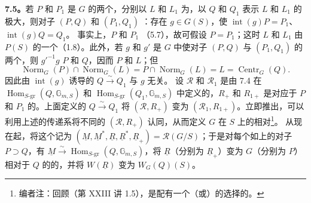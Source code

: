 \textbf{7.5。}若 $P$ 和 $P_1$ 是 $G$ 的两个，分别以 $L$ 和 $L_1$ 为，以 $Q$ 和 $Q_1$ 表示 $L$ 和 $L_1$ 的极大，则对子 $(P,Q)$ 和 $(P_1,Q_1)$ ：存在 $g\in G(S)$，使 $\operatorname{int}(g)P=P_1$、$\operatorname{int}(g)Q=Q_1$。
事实上，$P$ 和 $P_1$ （5.7），故可假设 $P=P_1$；这时 $L$ 和 $L_1$ 由 $P(S)$ 的一个（1.8）。此外，若 $g$ 和 $g'$ 是 $G$ 中使对子 $(P,Q)$ 与 $(P_1,Q_1)$ 的两个，则 $g'^{-1}g$  $P$ 和 $Q$，因而 $P$ 和 $L$；但
\[
 \operatorname{Norm}_G(P)\cap\operatorname{Norm}_G(L)
 =P\cap\operatorname{Norm}_G(L)=L=\operatorname{Centr}_G(Q).
\]
因此由 $\operatorname{int}(g)$ 诱导的 $Q\xrightarrow{\sim}Q_1$ 与 $g$ 无关。
设 $\mathscr R$ 和 $\mathscr R_1$ 是由 7.4 在 $\operatorname{Hom}_{S\text{-gr}}(Q,\mathbb G_{m,S})$ 和 $\operatorname{Hom}_{S\text{-gr}}(Q_1,\mathbb G_{m,S})$ 中定义的，$R_+$ 和 $R_{1+}$ 是对应于 $P$ 和 $P_1$ 的。上面定义的 $Q\xrightarrow{\sim}Q_1$ 将
$(\mathscr R,R_+)$ 变为 $(\mathscr R_1,R_{1+})$。立即推出，可以利用上述的传递系将不同的 $(\mathscr R,R_+)$ 认同，从而定义 $G$ 在 $S$ 上的相对\footnote{编者注：回顾（第 XXIII 讲 1.5），是配有一个（或）的选择的。}。
从现在起，将这个记为
$(\underline M,\underline M^*,\underline R,\underline R^*,\underline R_+)=\mathscr R(G/S)$；于是对每个如上的对子 $P\supset Q$，有 $\underline M\xrightarrow{\sim}\operatorname{Hom}_{S\text{-gr}}(Q,\mathbb G_{m,S})$，将 $\underline R$（分别为 $\underline R_+$）变为 $G$（分别为 $P$）相对于 $Q$ 的的，并将 $W(\underline R)$ 变为 $W_G(Q)(S)$。

